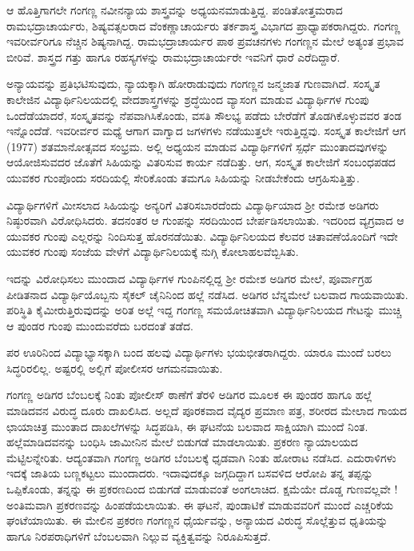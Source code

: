 {ಆ ಹೊತ್ತಿಗಾಗಲೇ ಗಂಗಣ್ಣ ನವೀನನ್ಯಾಯ ಶಾಸ್ತ್ರವನ್ನು ಅಧ್ಯಯನಮಾಡುತ್ತಿದ್ದ. ಪಂಡಿತೋತ್ತಮರಾದ ರಾಮಭದ್ರಾಚಾರ್ಯರು, ಶಿಷ್ಯವತ್ಸಲರಾದ ವೆಂಕಣ್ಣಾಚಾರ್ಯರು ತರ್ಕಶಾಸ್ತ್ರ ವಿಭಾಗದ ಪ್ರಾಧ್ಯಾಪಕರಾಗಿದ್ದರು. ಗಂಗಣ್ಣ ಇವರೀರ್ವರಿಗೂ ನೆಚ್ಚಿನ ಶಿಷ್ಯನಾಗಿದ್ದ. ರಾಮಭದ್ರಾಚಾರ್ಯರ ಪಾಠ  \enginline{-}  ಪ್ರವಚನಗಳು ಗಂಗಣ್ಣನ ಮೇಲೆ ಅತ್ಯಂತ ಪ್ರಭಾವ ಬೀರಿವೆ. ಶಾಸ್ತ್ರದ ಗತ್ತು ಹಾಗೂ ರಹಸ್ಯಗಳನ್ನು ರಾಮಭದ್ರಾಚಾರ್ಯರೇ ಇವನಿಗೆ ಧಾರೆ ಎರೆದಿದ್ದಾರೆ.

ಅನ್ಯಾಯವನ್ನು ಪ್ರತಿಭಟಿಸುವುದು, ನ್ಯಾಯಕ್ಕಾಗಿ ಹೋರಾಡುವುದು ಗಂಗಣ್ಣನ ಜನ್ಮಜಾತ ಗುಣವಾಗಿದೆ. ಸಂಸ್ಕೃತ ಕಾಲೇಜಿನ ವಿದ್ಯಾರ್ಥಿನಿಲಯದಲ್ಲಿ ವೇದಶಾಸ್ತ್ರಗಳನ್ನು ಶ್ರದ್ಧೆಯಿಂದ ವ್ಯಾಸಂಗ ಮಾಡುವ ವಿದ್ಯಾರ್ಥಿಗಳ ಗುಂಪು ಒಂದೆಡೆಯಾದರೆ, ಸಂಸ್ಕೃತವನ್ನು ನೆಪವಾಗಿಸಿಕೊಂಡು, ವಸತಿ ಸೌಲಭ್ಯ ಪಡೆದು ಬೇರೆಡೆಗೆ ತೊಡಗಿಕೊಳ್ಳುವವರ ತಂಡ ಇನ್ನೊಂದೆಡೆ. ಇವರೀರ್ವರ ಮಧ್ಯೆ ಆಗಾಗ ವಾಗ್ವಾದ  \enginline{-}  ಜಗಳಗಳು ನಡೆಯುತ್ತಲೇ ಇರುತ್ತಿದ್ದವು. ಸಂಸ್ಕೃತ ಕಾಲೇಜಿಗೆ ಆಗ (1977) ಶತಮಾನೋತ್ಸವದ ಸಂಭ್ರಮ. ಅಲ್ಲಿ ಅಧ್ಯಯನ ಮಾಡುವ ವಿದ್ಯಾರ್ಥಿಗಳಿಗೆ ಸ್ಪರ್ಧೆ ಮುಂತಾದವುಗಳನ್ನು ಆಯೋಜಿಸುವದರ ಜೊತೆಗೆ ಸಿಹಿಯನ್ನು ವಿತರಿಸುವ ಕಾರ್ಯ ನಡೆದಿತ್ತು. ಆಗ, ಸಂಸ್ಕೃತ ಕಾಲೇಜಿಗೆ ಸಂಬಂಧಪಡದ ಯುವಕರ ಗುಂಪೊಂದು ಸರದಿಯಲ್ಲಿ ಸೇರಿಕೊಂಡು ತಮಗೂ ಸಿಹಿಯನ್ನು ನೀಡಬೇಕೆಂದು ಆಗ್ರಹಿಸುತ್ತಿತ್ತು.

ವಿದ್ಯಾರ್ಥಿಗಳಿಗೆ ಮೀಸಲಾದ ಸಿಹಿಯನ್ನು ಅನ್ಯರಿಗೆ ವಿತರಿಸಬಾರದೆಂದು ವಿದ್ಯಾರ್ಥಿಯಾದ ಶ್ರೀ ರಮೇಶ ಅಡಿಗರು ನಿಷ್ಠುರವಾಗಿ ವಿರೋಧಿಸಿದರು. ತದನಂತರ ಆ ಗುಂಪನ್ನು ಸರದಿಯಿಂದ ಬೇರ್ಪಡಿಸಲಾಯಿತು. ಇದರಿಂದ ವ್ಯಗ್ರವಾದ ಆ ಯುವಕರ ಗುಂಪು ಎಲ್ಲರನ್ನು ನಿಂದಿಸುತ್ತ ಹೊರನಡೆಯಿತು. ವಿದ್ಯಾರ್ಥಿನಿಲಯದ ಕೆಲವರ ಚಿತಾವಣೆಯೊಂದಿಗೆ ಇದೇ ಯುವಕರ ಗುಂಪು ಸಂಜೆಯ ವೇಳೆಗೆ ವಿದ್ಯಾರ್ಥಿನಿಲಯಕ್ಕೆ ನುಗ್ಗಿ ಕೋಲಾಹಲವೆಬ್ಬಿಸಿತು. 

ಇದನ್ನು ವಿರೋಧಿಸಲು ಮುಂದಾದ ವಿದ್ಯಾರ್ಥಿಗಳ ಗುಂಪಿನಲ್ಲಿದ್ದ ಶ್ರೀ ರಮೇಶ ಅಡಿಗರ ಮೇಲೆ, ಪೂರ್ವಾಗ್ರಹ ಪೀಡಿತನಾದ ವಿದ್ಯಾರ್ಥಿಯೊಬ್ಬನು ಸೈಕಲ್ ಚೈನಿನಿಂದ ಹಲ್ಲೆ ನಡೆಸಿದ. ಅಡಿಗರ ಬೆನ್ನಮೇಲೆ ಬಲವಾದ ಗಾಯವಾಯಿತು. ಪರಿಸ್ಥಿತಿ ಕೈಮೀರುತ್ತಿರುವುದನ್ನು ಅರಿತ ಅಲ್ಲೆ ಇದ್ದ ಗಂಗಣ್ಣ ಸಮಯೋಚಿತವಾಗಿ ವಿದ್ಯಾರ್ಥಿನಿಲಯದ ಗೇಟನ್ನು ಮುಚ್ಚಿ ಆ ಪುಂಡರ ಗುಂಪು ಮುಂದುವರೆದು ಬರದಂತೆ ತಡೆದ.

ಪರ ಊರಿನಿಂದ ವಿದ್ಯಾಭ್ಯಾಸಕ್ಕಾಗಿ ಬಂದ ಹಲವು ವಿದ್ಯಾರ್ಥಿಗಳು ಭಯಭೀತರಾಗಿದ್ದರು. ಯಾರೂ ಮುಂದೆ ಬರಲು ಸಿದ್ಧರಿರಲಿಲ್ಲ. ಅಷ್ಟರಲ್ಲಿ ಅಲ್ಲಿಗೆ ಪೋಲೀಸರ ಆಗಮನವಾಯಿತು. 

ಗಂಗಣ್ಣ ಅಡಿಗರ ಬೆಂಬಲಕ್ಕೆ ನಿಂತು ಪೋಲೀಸ್ ಠಾಣೆಗೆ ತೆರಳಿ ಅಡಿಗರ ಮೂಲಕ ಈ ಪುಂಡರ ಹಾಗೂ ಹಲ್ಲೆ ಮಾಡಿದವನ ವಿರುದ್ಧ ದೂರು ದಾಖಲಿಸಿದ. ಅಲ್ಲದೆ ಪೂರಕವಾದ ವೈದ್ಯರ ಪ್ರಮಾಣ ಪತ್ರ, ಶರೀರದ ಮೇಲಾದ ಗಾಯದ ಛಾಯಾಚಿತ್ರ ಮುಂತಾದ ದಾಖಲೆಗಳನ್ನು ಸಿದ್ಧಪಡಿಸಿ, ಈ ಘಟನೆಯ ಬಲವಾದ ಸಾಕ್ಷಿಯಾಗಿ ಮುಂದೆ ನಿಂತ. ಹಲ್ಲೆಮಾಡಿದವನನ್ನು ಬಂಧಿಸಿ ಜಾಮೀನಿನ ಮೇಲೆ ಬಿಡುಗಡೆ ಮಾಡಲಾಯಿತು. ಪ್ರಕರಣ ನ್ಯಾಯಾಲಯದ ಮೆಟ್ಟಿಲನ್ನೇರಿತು. ಆದ್ಯಂತವಾಗಿ ಗಂಗಣ್ಣ ಅಡಿಗರ ಬೆಂಬಲಕ್ಕೆ ಧೃಡವಾಗಿ ನಿಂತು ಹೋರಾಟ ನಡೆಸಿದ. ಎದುರಾಳಿಗಳು ಇದಕ್ಕೆ ಜಾತಿಯ ಬಣ್ಣಕಟ್ಟಲು ಮುಂದಾದರು. ಇದಾವುದಕ್ಕೂ ಜಗ್ಗದಿದ್ದಾಗ ಬಸವಳಿದ ಆರೋಪಿ ತನ್ನ ತಪ್ಪನ್ನು ಒಪ್ಪಿಕೊಂಡು, ತನ್ನನ್ನು ಈ ಪ್ರಕರಣದಿಂದ ಬಿಡುಗಡೆ ಮಾಡುವಂತೆ ಅಂಗಲಾಚಿದ. ಕ್ಷಮೆಯೇ ದೊಡ್ಡ ಗುಣವಲ್ಲವೇ ! ಅಂತಿಮವಾಗಿ ಪ್ರಕರಣವನ್ನು ಹಿಂಪಡೆಯಲಾಯಿತು. ಈ ಘಟನೆ, ಪುಂಡಾಟಿಕೆ ಮಾಡುವವರಿಗೆ ಮುಂದೆ ಎಚ್ಚರಿಕೆಯ ಘಂಟೆಯಾಯಿತು. ಈ ಮೇಲಿನ ಪ್ರಕರಣ ಗಂಗಣ್ಣನ ಧೈರ್ಯವನ್ನು, ಅನ್ಯಾಯದ ವಿರುದ್ಧ ಸೊಲ್ಲೆತ್ತುವ ಧೃತಿಯನ್ನು ಹಾಗೂ ನಿರಪರಾಧಿಗಳಿಗೆ ಬೆಂಬಲವಾಗಿ ನಿಲ್ಲುವ ವ್ಯಕ್ತಿತ್ವವನ್ನು ನಿರೂಪಿಸುತ್ತದೆ.  

}
